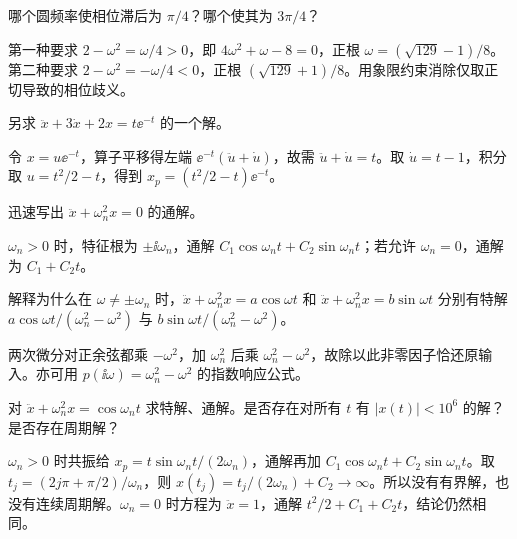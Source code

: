\begin{exercise}\label{cw:rec11-5}
哪个圆频率使相位滞后为 $\pi/4$？哪个使其为 $3\pi/4$？
\end{exercise}
\begin{solution}
第一种要求 $2-\omega^2=\omega/4>0$，即 $4\omega^2+\omega-8=0$，正根 $\omega=(\sqrt{129}-1)/8$。第二种要求 $2-\omega^2=-\omega/4<0$，正根 $(\sqrt{129}+1)/8$。用象限约束消除仅取正切导致的相位歧义。
\par{}
\end{solution}

\begin{exercise}\label{cw:rec11-6}
另求 $\ddot x+3\dot x+2x=t\ee^{-t}$ 的一个解。
\end{exercise}
\begin{solution}
令 $x=u\ee^{-t}$，算子平移得左端 $\ee^{-t}(\ddot u+\dot u)$，故需 $\ddot u+\dot u=t$。取 $\dot u=t-1$，积分取 $u=t^2/2-t$，得到 $x_p=(t^2/2-t)\ee^{-t}$。
\par{}
\end{solution}

\begin{exercise}\label{cw:rec13-1}
迅速写出 $\ddot x+\omega_n^2x=0$ 的通解。
\end{exercise}
\begin{solution}
$\omega_n>0$ 时，特征根为 $\pm\ii\omega_n$，通解 $C_1\cos\omega_nt+C_2\sin\omega_nt$；若允许 $\omega_n=0$，通解为 $C_1+C_2t$。
\par{}
\end{solution}

\begin{exercise}\label{cw:rec13-2}
解释为什么在 $\omega\ne\pm\omega_n$ 时，$\ddot x+\omega_n^2x=a\cos\omega t$ 和 $\ddot x+\omega_n^2x=b\sin\omega t$ 分别有特解 $a\cos\omega t/(\omega_n^2-\omega^2)$ 与 $b\sin\omega t/(\omega_n^2-\omega^2)$。
\end{exercise}
\begin{solution}
两次微分对正余弦都乘 $-\omega^2$，加 $\omega_n^2$ 后乘 $\omega_n^2-\omega^2$，故除以此非零因子恰还原输入。亦可用 $p(\ii\omega)=\omega_n^2-\omega^2$ 的指数响应公式。
\par{}
\end{solution}

\begin{exercise}\label{cw:rec13-3}
对 $\ddot x+\omega_n^2x=\cos\omega_nt$ 求特解、通解。是否存在对所有 $t$ 有 $|x(t)|<10^6$ 的解？是否存在周期解？
\end{exercise}
\begin{solution}
$\omega_n>0$ 时共振给 $x_p=t\sin\omega_nt/(2\omega_n)$，通解再加 $C_1\cos\omega_nt+C_2\sin\omega_nt$。取 $t_j=(2j\pi+\pi/2)/\omega_n$，则 $x(t_j)=t_j/(2\omega_n)+C_2\to\infty$。所以没有有界解，也没有连续周期解。$\omega_n=0$ 时方程为 $\ddot x=1$，通解 $t^2/2+C_1+C_2t$，结论仍然相同。
\par{}
\end{solution}

